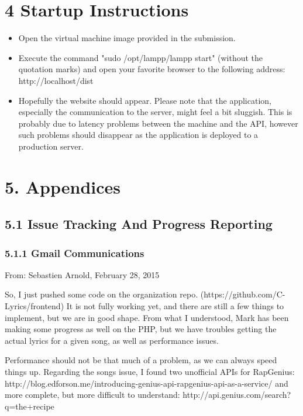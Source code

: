 \documentclass[]{article}
\begin{document}
\section{4 Startup Instructions}\label{startup-instructions}

\begin{itemize}
\itemsep1pt\parskip0pt
\item
  Open the virtual machine image provided in the submission.
\item
  Execute the command "sudo /opt/lampp/lampp start" (without the quotation marks) and open your favorite browser to the following address: http://localhost/dist
 \item
 Hopefully the website should appear. Please note that the application, especially the communication to the server, might feel a bit sluggish. This is probably due to latency problems between the machine and the API, however such problems should disappear as the application is deployed to a production server.
\end{itemize}


\section{\textbf{5. Appendices}}\label{appendices}

\subsection{\textbf{5.1 Issue Tracking And Progress
Reporting}}\label{issue-tracking-and-progress-reporting}

\subsubsection{5.1.1 Gmail Communications}\label{gmail-communications}

From: Sebastien Arnold, February 28, 2015

So, I just pushed some code on the organization repo.
(https://github.com/C-Lyrics/frontend) It is not fully working yet, and
there are still a few things to implement, but we are in good shape.
From what I understood, Mark has been making some progress as well on
the PHP, but we have troubles getting the actual lyrics for a given
song, as well as performance issues.

Performance should not be that much of a problem, as we can always speed
things up. Regarding the songs issue, I found two unofficial APIs for
RapGenius:
http://blog.edforson.me/introducing-genius-api-rapgenius-api-as-a-service/
and more complete, but more difficult to understand:
http://api.genius.com/search?q=the+recipe
\end{document}
